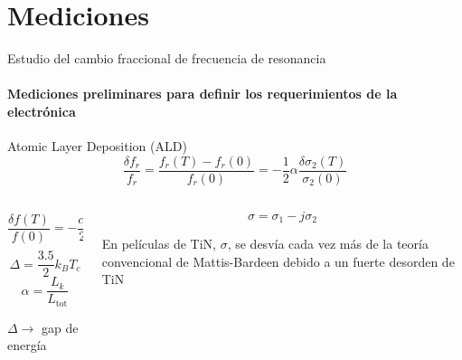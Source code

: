 \documentclass[ignorenonframetext,12pt]{beamer}
\begin{document}
\section{Mediciones}
								\begin{frame}{Estudio del cambio fraccional de frecuencia de resonancia}
												\framesubtitle{Mediciones preliminares para definir los requerimientos
												de la electrónica}
												Atomic Layer Deposition (ALD)
												\begin{equation*}
																\frac{\delta f_r}{f_r} = \frac{f_r(T) -
																f_r(0)}{f_r(0)} = -\frac{1}{2}\alpha\frac{\delta
																\sigma_2(T)}{\sigma_2(0)}
												\end{equation*}
												\begin{columns}
																\begin{column}{0.49\textwidth}
																				{\color{blue}\begin{equation*}
																								\frac{\delta f(T)}{f(0)} = 
																								-\frac{\alpha}{2}\sqrt{\frac{\pi \Delta}{2 k_B
																								T}} e^{-\frac{\Delta}{k_B T}}
																				\end{equation*}}
																				\begin{equation*}
																								\Delta = \frac{3.5}{2} k_B T_c
																				\end{equation*}
																				\begin{equation*}
																								\alpha = \frac{L_k}{L_\text{tot}}
																				\end{equation*}

																				$\Delta \to$ gap de energía
																\end{column}
																\begin{column}{0.49\textwidth}
																				\begin{equation*}
																								\sigma = \sigma_1 - j \sigma_2
																				\end{equation*}

																				En películas de TiN, $\sigma$, se desvía cada vez más de la
																				teoría convencional	de Mattis-Bardeen debido a un \alert{fuerte
																				desorden de TiN}
																\end{column}
												\end{columns}
								\end{frame}
\end{document}
